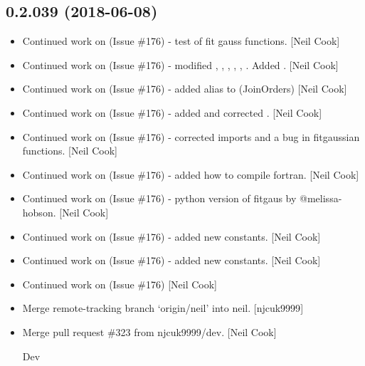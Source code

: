 \documentclass[a4paper,10pt,english]{report}
\begin{document}
\subsection{0.2.039 (2018-06-08)}
\label{\detokenize{misc/changelog:id425}}\begin{itemize}
\item {} 
Continued work on  (Issue \#176) - test of fit gauss functions.
{[}Neil Cook{]}

\item {} 
Continued work on  (Issue \#176) - modified
, , ,
, ,
. Added . {[}Neil Cook{]}

\item {} 
Continued work on  (Issue \#176) - added alias to
 (JoinOrders) {[}Neil Cook{]}

\item {} 
Continued work on  (Issue \#176) - added 
and corrected . {[}Neil Cook{]}

\item {} 
Continued work on  (Issue \#176) - corrected imports and a bug in
fitgaussian functions. {[}Neil Cook{]}

\item {} 
Continued work on  (Issue \#176) - added how to compile fortran.
{[}Neil Cook{]}

\item {} 
Continued work on  (Issue \#176) - python version of fitgaus by
@melissa-hobson. {[}Neil Cook{]}

\item {} 
Continued work on  (Issue \#176) - added new constants. {[}Neil
Cook{]}

\item {} 
Continued work on  (Issue \#176) - added new constants. {[}Neil
Cook{]}

\item {} 
Continued work on  (Issue \#176) {[}Neil Cook{]}

\item {} 
Merge remote-tracking branch ‘origin/neil’ into neil. {[}njcuk9999{]}

\item {} 
Merge pull request \#323 from njcuk9999/dev. {[}Neil Cook{]}

Dev

\end{itemize}
\end{document}
